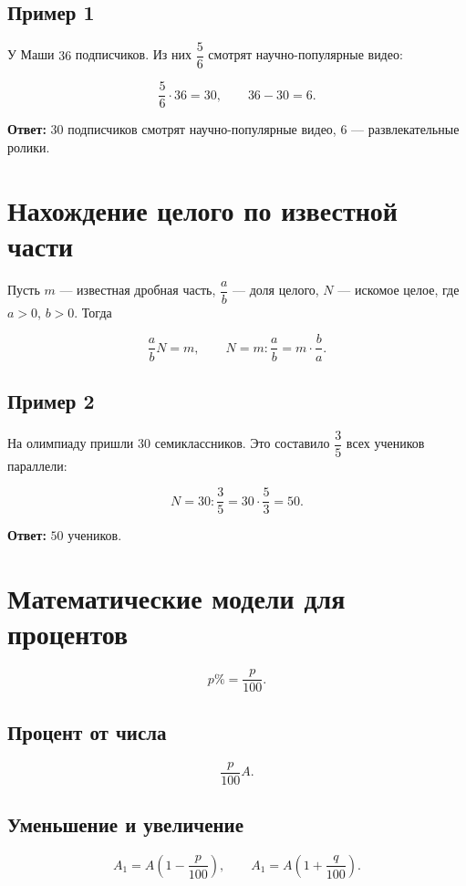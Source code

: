 \documentclass[a4paper,12pt]{article}
\begin{document}
\subsection*{Пример 1}

У Маши \(36\) подписчиков. Из них \(\dfrac{5}{6}\) смотрят научно-популярные видео:

\[
\frac{5}{6}\cdot36=30,
\qquad
36-30=6.
\]

\textbf{Ответ:} \(30\) подписчиков смотрят научно-популярные видео, \(6\) --- развлекательные ролики.

\section{Нахождение целого по известной части}

Пусть \(m\) --- известная дробная часть, \(\dfrac{a}{b}\) --- доля целого, \(N\) --- искомое целое, где \(a>0\), \(b>0\). Тогда

\[
\frac{a}{b}N=m,
\qquad
\boxed{N=m:\frac{a}{b}=m\cdot\frac{b}{a}}.
\]

\subsection*{Пример 2}

На олимпиаду пришли \(30\) семиклассников. Это составило \(\dfrac{3}{5}\) всех учеников параллели:

\[
N=30:\frac{3}{5}=30\cdot\frac{5}{3}=50.
\]

\textbf{Ответ:} \(50\) учеников.

\section{Математические модели для процентов}

\[
p\%=\frac{p}{100}.
\]

\subsection{Процент от числа}

\[
\boxed{\frac{p}{100}A}.
\]

\subsection{Уменьшение и увеличение}

\[
\boxed{A_1=A\left(1-\frac{p}{100}\right)},
\qquad
\boxed{A_1=A\left(1+\frac{q}{100}\right)}.
\]
\end{document}
